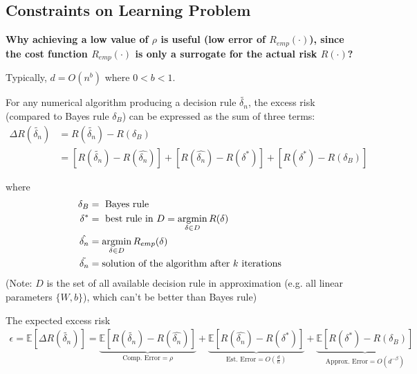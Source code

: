 \documentclass[11pt]{elegantbook}
\newcommand{\argmin}{\operatornamewithlimits{argmin}}
\begin{document}
\subsection{Constraints on Learning Problem}
\textbf{Why achieving a low value of $\rho$ is useful (low error of $R_{emp}(\cdot)$), since the cost function $R_{emp}(\cdot)$ is only a surrogate for the actual risk $R(\cdot)$?}


Typically, $d=O(n^b)$ where $0<b<1$.

For any numerical algorithm producing a decision rule $\tilde{\delta_n}$, the excess risk (compared to Bayes rule $\delta_B$) can be expressed as the sum of three terms:
\begin{equation}
    \begin{aligned}
        \Delta R(\tilde{\delta_n})&=R(\tilde{\delta_n})-R(\delta_B)\\&=[R(\tilde{\delta_n})-R(\hat{\delta_n})]+[R(\hat{\delta_n})-R(\delta^*)]+[R(\delta^*)-R(\delta_B)]
    \end{aligned}
    \nonumber
\end{equation}

where
\begin{equation}
    \begin{aligned}
        \delta_B&=\text{ Bayes rule}\\
        \delta^*&=\text{ best rule in } D=\argmin_{\delta\in D} R(\delta)\\
        \hat{\delta_n}&=\argmin_{\delta\in D}R_{emp}(\delta)\\
        \tilde{\delta_n}&=\text{solution of the algorithm after $k$ iterations}
    \end{aligned}
    \nonumber
\end{equation}
(Note: $D$ is the set of all available decision rule in approximation (e.g. all linear parameters $\{W,b\}$), which can't be better than Bayes rule)

The expected excess risk
\begin{equation}
    \begin{aligned}
        \epsilon =\mathbb{E}[\Delta R(\tilde{\delta_n})]=\underbrace{\mathbb{E}[R(\tilde{\delta_n})-R(\hat{\delta_n})]}_{\text{Comp. Error}=\rho}+\underbrace{\mathbb{E}[R(\hat{\delta_n})-R(\delta^*)]}_{\text{Est. Error}=O(\frac{d}{n})}+\underbrace{\mathbb{E}[R(\delta^*)-R(\delta_B)]}_{\text{Approx. Error}=O(d^{-\beta})}
    \end{aligned}
    \nonumber
\end{equation}
\end{document}
